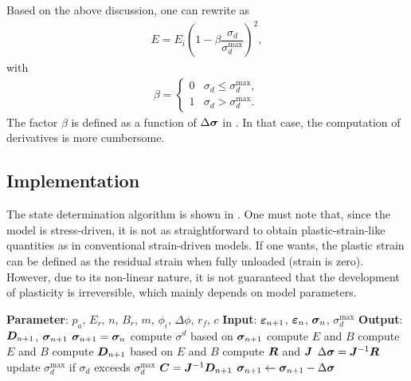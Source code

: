 Based on the above discussion, one can rewrite  as
\begin{gather}
E=E_i\left(1-\beta\dfrac{\sigma_d}{\sigma_d^{\text{max}}}\right)^2,
\end{gather}
with
\begin{gather}
\beta=\left\{\begin{array}{ll}
0&\sigma_d\leqslant\sigma_d^\text{max},\\
1&\sigma_d>\sigma_d^\text{max}.
\end{array}\right.
\end{gather}
The factor $\beta$ is defined as a function of $\Delta\bm{\sigma}$ in \cite{Katona2015}.
In that case, the computation of derivatives is more cumbersome.
\subsection{Implementation}
The state determination algorithm is shown in .
One must note that, since the model is stress-driven, it is not as straightforward to obtain plastic-strain-like quantities as in conventional strain-driven models.
If one wants, the plastic strain can be defined as the residual strain when fully unloaded (strain is zero).
However, due to its non-linear nature, it is not guaranteed that the development of plasticity is irreversible, which mainly depends on model parameters.
\begin{breakablealgorithm}
\caption{state determination of Duncan soil model}\label{algo:duncan_model}
\begin{algorithmic}
\State \textbf{Parameter}: $p_a$, $E_r$, $n$, $B_r$, $m$, $\phi_i$, $\Delta\phi$, $r_f$, $c$
\State \textbf{Input}: $\bm{\varepsilon}_{n+1}$, $\bm{\varepsilon}_n$, $\bm{\sigma}_n$, $\sigma_d^{\text{max}}$
\State \textbf{Output}: $\bm{D}_{n+1}$, $\bm{\sigma}_{n+1}$
\State $\bm{\sigma}_{n+1}=\bm{\sigma}_n$
\State compute $\sigma^d$ based on $\bm{\sigma}_{n+1}$
\State compute $E$ and $B$
\Else
\State compute $E$ and $B$
\EndIf
\State compute $\bm{D}_{n+1}$ based on $E$ and $B$
\State compute $\bm{R}$ and $\bm{J}$
\State $\Delta\bm{\sigma}=\bm{J}^{-1}\bm{R}$
\State update $\sigma_d^{\text{max}}$ if $\sigma_d$ exceeds $\sigma_d^{\text{max}}$
\State $\bm{C}=\bm{J}^{-1}\bm{D}_{n+1}$
\State \Return
\EndIf
\State $\bm{\sigma}_{n+1}\leftarrow\bm{\sigma}_{n+1}-\Delta\bm{\sigma}$
\EndWhile
\end{algorithmic}
\end{breakablealgorithm}
